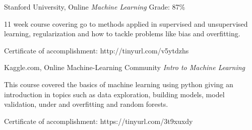 

\begin{cventries}

\cventry
  {Stanford University, Online} %
  {\textit{Machine Learning}}
  {Grade: 87\%} %
  {} %
  {
    \begin{cvitems} %
      \item {11 week course covering go to methods applied in supervised and unsupervised learning, regularization and how to tackle problems like bias and overfitting.}
      \item {Certificate of accomplishment: http://tinyurl.com/v5ytdzhs}
    \end{cvitems}
  }
  \newline
\cventry
  {Kaggle.com, Online Machine-Learning Community} %
  {\textit{Intro to Machine Learning}}
  {} %
  {} %
  {
    \begin{cvitems} %
      \item {This course covered the basics of machine learning using python giving an introduction in topics such as data exploration, building models, model validation, under and overfitting and random forests.}
      \item {Certificate of accomplishment: https://tinyurl.com/3t9xuxdy}
    \end{cvitems}
  }
  \newline


\end{cventries}
